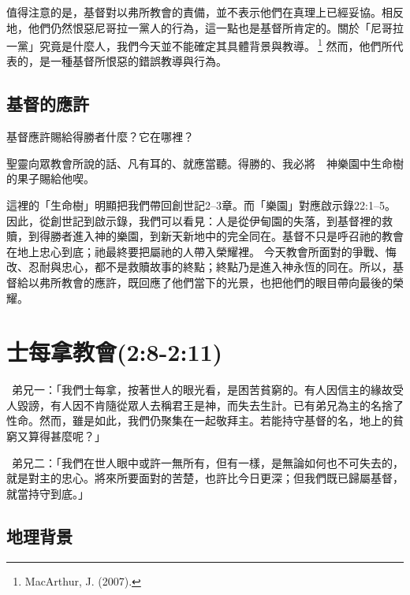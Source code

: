 值得注意的是，基督對以弗所教會的責備，並不表示他們在真理上已經妥協。相反地，他們仍然恨惡尼哥拉一黨人的行為，這一點也是基督所肯定的。關於「尼哥拉一黨」究竟是什麼人，我們今天並不能確定其具體背景與教導。 \footnote{MacArthur, J. (2007).} 然而，他們所代表的，是一種基督所恨惡的錯誤教導與行為。

\subsection{基督的應許}

\begin{ScriptureBox2}{基督應許賜給得勝者什麼？它在哪裡？}

\item[2:7] 聖靈向眾教會所說的話、凡有耳的、就應當聽。得勝的、我必將　神樂園中生命樹的果子賜給他喫。

\end{ScriptureBox2}

這裡的「生命樹」明顯把我們帶回創世記2–3章。而「樂園」對應啟示錄22:1–5。因此，從創世記到啟示錄，我們可以看見：人是從伊甸園的失落，到基督裡的救贖，到得勝者進入神的樂園，到新天新地中的完全同在。基督不只是呼召祂的教會在地上忠心到底；祂最終要把屬祂的人帶入榮耀裡。
今天教會所面對的爭戰、悔改、忍耐與忠心，都不是救贖故事的終點；終點乃是進入神永恆的同在。所以，基督給以弗所教會的應許，既回應了他們當下的光景，也把他們的眼目帶向最後的榮耀。

\section{士每拿教會(2:8-2:11)}

\begin{DialogueBox}
\noindent\faUser\ 弟兄一：「我們士每拿，按著世人的眼光看，是困苦貧窮的。有人因信主的緣故受人毀謗，有人因不肯隨從眾人去稱君王是神，而失去生計。已有弟兄為主的名捨了性命。然而，雖是如此，我們仍聚集在一起敬拜主。若能持守基督的名，地上的貧窮又算得甚麼呢？」

\noindent\faUser\ 弟兄二：「我們在世人眼中或許一無所有，但有一樣，是無論如何也不可失去的，就是對主的忠心。將來所要面對的苦楚，也許比今日更深；但我們既已歸屬基督，就當持守到底。」
\end{DialogueBox}

\subsection{地理背景}

